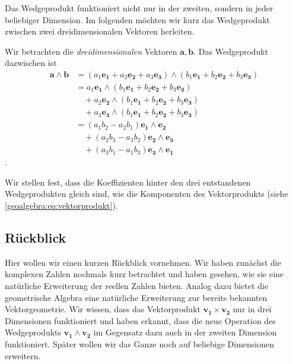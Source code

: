 Das Wedgeprodukt funktioniert nicht nur in der zweiten, sondern
in jeder beliebiger Dimension. Im folgenden möchten wir kurz
das Wedgeprodukt zwischen zwei dreidimensionalen Vektoren
herleiten.

\begin{definition}
Wir betrachten die \emph{dreidimensionalen} Vektoren $\mathbf{a}, \mathbf{b}$.
Das Wedgeprodukt dazwischen ist
  \newcommand{\eone}{\mathbf{e_1}}
  \newcommand{\etwo}{\mathbf{e_2}}
  \newcommand{\ethree}{\mathbf{e_3}}
\begin{equation}
  \begin{aligned}
      \mathbf{a} \wedge \mathbf{b} &= (a_1 \eone + a_2 \etwo + a_3 \ethree) \wedge (b_1 \eone + b_2 \etwo + b_3 \ethree) \\
      &= a_1 \eone \wedge (b_1 \eone + b_2 \etwo + b_3 \ethree) \\
      &\quad+ a_2 \etwo \wedge (b_1 \eone + b_2 \etwo + b_3 \ethree) \\
      &\quad+ a_3 \ethree \wedge (b_1 \eone + b_2 \etwo + b_3 \ethree) \\
      &= (a_1 b_2 - a_2 b_1) \eone \wedge \etwo \\
      &\quad+ (a_2 b_3 - a_3 b_2) \etwo \wedge \ethree \\
      &\quad+ (a_3 b_1 - a_1 b_3) \ethree \wedge \eone
  \end{aligned}
\end{equation}
.
\end{definition}
Wir stellen fest, dass die Koeffizienten hinter den drei entstandenen Wedgeprodukten
gleich sind, wie die Komponenten des Vektorprodukts (siehe \autoref{geoalgebra:eq:vektorprodukt}).

\subsection{Rückblick}
Hier wollen wir einen kurzen Rückblick vornehmen. Wir haben zunächst
die komplexen Zahlen nochmals kurz betrachtet und haben gesehen,
wie sie eine natürliche Erweiterung der reellen Zahlen bieten.
Analog dazu bietet die geometrische Algebra eine natürliche
Erweiterung zur bereits bekannten Vektorgeometrie. Wir wissen,
dass das Vektorprodukt $\mathbf{v_1} \times \mathbf{v_2}$ nur
in drei Dimensionen funktioniert und haben erkannt, dass
die neue Operation des Wedgeprodukts $\mathbf{v_1} \wedge \mathbf{v_2}$
im Gegensatz dazu auch in der zweiten Dimension funktioniert.
Später wollen wir das Ganze noch auf beliebige Dimensionen erweitern.
